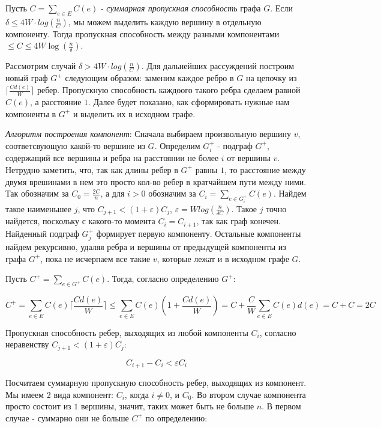 \documentclass[12pt]{article} %
\begin{document}
\begin{ProofLemma}
    Пусть $C = \underset{e \in E}{\sum} C(e)$ - \emph{суммарная пропускная способность} графа $G$. Если $\delta \leq 4W \cdot log(\frac{n}{C})$, мы можем выделить каждую вершину в отдельную компоненту. Тогда пропускная способность между разными компонентами $\leq C \leq 4W \log(\frac{n}{\delta})$.
    
    Рассмотрим случай $\delta > 4W \cdot log(\frac{n}{C})$. Для дальнейших рассуждений построим новый граф $G^{+}$ следующим образом: заменим каждое ребро в $G$ на цепочку из $\lceil \frac{Cd(e)}{W} \rceil$ ребер. Пропускную способность каждоого такого ребра сделаем равной $C(e)$, а расстояние $1$. Далее будет показано, как сформировать нужные нам компоненты в $G^{+}$ и выделить их в исходном графе.
    
    \emph{Алгоритм построения компонент}:
    Сначала выбираем произвольную вершину $v$, соответсвующую какой-то вершине из $G$. Определим $G_i^{+}$ - подграф $G^{+}$, содержащий все вершины и ребра на расстоянии не более $i$ от вершины $v$. Нетрудно заметить, что, так как длины ребер в $G^{+}$ равны $1$, то расстояние между двумя врешинами в нем это просто кол-во ребер в кратчайшем пути между ними. Так обозначим за $C_0 = \frac{2C}{n}$, а для $i > 0$ обозначим за $C_i = \underset{e \in G_i^{+}}{\sum} C(e)$. Найдем такое наименьшее $j$, что $C_{j+1} < (1 + \varepsilon) C_j$, $\varepsilon = W log(\frac{n}{\delta C})$. Такое $j$ точно найдется, поскольку с какого-то момента $C_i = C_{i + 1}$, так как граф конечен. Найденный подграф $G_j^{+}$ формирует первую компоненту. Остальные компоненты найдем рекурсивно, удаляя ребра и вершины от предыдущей компоненты из графа $G^{+}$, пока не исчерпаем все такие $v$, которые лежат и в исходном графе $G$.
    
    Пусть $C^{+} = \underset{e \in G^{+}}{\sum} C(e)$. Тогда, согласно определению $G^{+}$:
    
    $$C^{+} = \underset{e \in E}{\sum}C(e) \lceil \frac{C d(e)}{W} \rceil \leq \underset{e \in E}{\sum} C(e) (1 + \frac{C d(e)}{W}) = C + \frac{C}{W} \underset{e \in E}{\sum} C(e)d(e) = C + C = 2C$$
    
    Пропускная способность ребер, выходящих из любой компоненты $C_i$, согласно неравенству $C_{j + 1} < (1 + \varepsilon) C_j$:
    
    $$C_{i + 1} - C_i < \varepsilon C_i$$
    
    Посчитаем суммарную пропускную способность ребер, выходящих из компонент. Мы имеем 2 вида компонент: $C_i$, когда $i \neq 0$, и $C_0$. Во втором случае компонента просто состоит из $1$ вершины, значит, таких может быть не больше $n$. В первом случае - суммарно они не больше $C^{+}$ по определению:
    

\end{ProofLemma}
\end{document}
